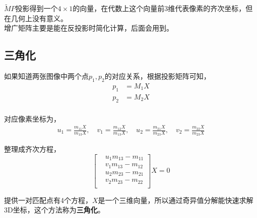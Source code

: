 	$\tilde{M}P$投影得到一个$4\times 1$的向量，在代数上这个向量前3维代表像素的齐次坐标，但在几何上没有意义。\\

	增广矩阵主要是能在反投影时简化计算，后面会用到。

\subsection{三角化}
	如果知道两张图像中两个点$p_1,p_2$的对应关系，根据投影矩阵可知，
	\begin{align*}
		p_1 &= M_1 X\\
		p_2 &= M_2 X\\
	\end{align*}

	对应像素坐标为，
	\begin{align*}
		u_1 = \frac{m_{11} X}{m_{13} X}, \quad v_1 = \frac{m_{12} X}{m_{13} X},\quad
		u_2 = \frac{m_{21} X}{m_{23} X}, \quad v_2 = \frac{m_{22} X}{m_{23} X}
	\end{align*}

	整理成齐次方程，
	$$
		\begin{bmatrix*}
			&u_1m_{13} - m_{11}\\
			&v_1m_{13} - m_{12}\\
			&u_2m_{23} - m_{21}\\
			&v_2m_{23} - m_{22}\\
		\end{bmatrix*} X = 0
	$$

	提供一对匹配点有4个方程，$X$是一个三维向量，所以通过奇异值分解能快速求解3D坐标，这个方法称为\textbf{三角化}。
